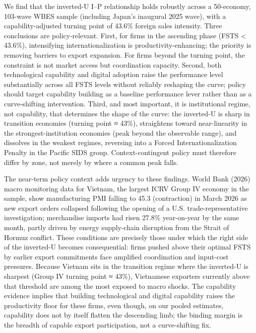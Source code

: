 \documentclass[
  12pt,a4paper]{article}
\begin{document}
We find that the inverted-U I--P relationship holds robustly across a
50-economy, 103-wave WBES sample (including Japan's inaugural 2025
wave), with a capability-adjusted turning point of 43.6\% foreign sales
intensity. Three conclusions are policy-relevant. First, for firms in
the ascending phase (FSTS \textless{} 43.6\%), intensifying
internationalization is productivity-enhancing; the priority is removing
barriers to export expansion. For firms beyond the turning point, the
constraint is not market access but coordination capacity. Second, both
technological capability and digital adoption raise the performance
level substantially across all FSTS levels without reliably reshaping
the curve; policy should target capability building as a baseline
performance lever rather than as a curve-shifting intervention. Third,
and most important, it is institutional regime, not capability, that
determines the shape of the curve: the inverted-U is sharp in transition
economies (turning point ≈ 43\%), straightens toward near-linearity in
the strongest-institution economies (peak beyond the observable range),
and dissolves in the weakest regimes, reversing into a Forced
Internationalization Penalty in the Pacific SIDS group.
Context-contingent policy must therefore differ by zone, not merely by
where a common peak falls.

The near-term policy context adds urgency to these findings. World Bank
(2026) macro monitoring data for Vietnam, the largest ICRV Group IV
economy in the sample, show manufacturing PMI falling to 45.3
(contraction) in March 2026 as new export orders collapsed following the
opening of a U.S. trade-representative investigation; merchandise
imports had risen 27.8\% year-on-year by the same month, partly driven
by energy supply-chain disruption from the Strait of Hormuz conflict.
These conditions are precisely those under which the right side of the
inverted-U becomes consequential: firms pushed above their optimal FSTS
by earlier export commitments face amplified coordination and input-cost
pressures. Because Vietnam sits in the transition regime where the
inverted-U is sharpest (Group IV turning point ≈ 43\%), Vietnamese
exporters currently above that threshold are among the most exposed to
macro shocks. The capability evidence implies that building
technological and digital capability raises the productivity floor for
these firms, even though, on our pooled estimates, capability does not
by itself flatten the descending limb; the binding margin is the breadth
of capable export participation, not a curve-shifting fix.
\end{document}
